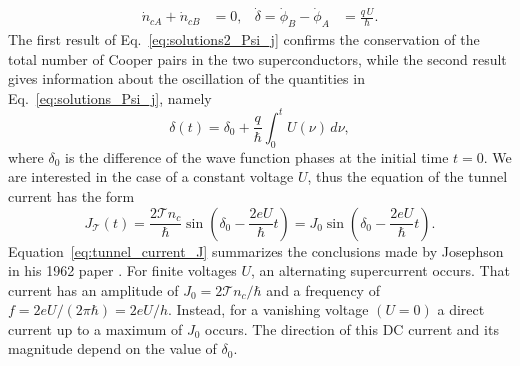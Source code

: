 \documentclass[../main/main.tex]{subfiles}
\begin{document}
\begin{align} \label{eq:solutions2_Psi_j}
    \dot{n}_{cA} + \dot{n}_{cB} &= 0, & 
    \dot{\delta} = \dot{\phi}_B - \dot{\phi}_A &= \frac{q\, U}{\hbar}.
\end{align}
The first result of Eq.~\eqref{eq:solutions2_Psi_j}
confirms the conservation of the total number of Cooper pairs in the two superconductors, while the second result gives information about the oscillation of the quantities in Eq.~\eqref{eq:solutions_Psi_j}, namely
\begin{equation} \label{eq:delta_time_integration}
    \delta(t) = \delta_0 + \frac{q}{\hbar} \int_{0}^{t} U(\nu) \,d\nu ,
\end{equation}
where $\delta_0$ is the difference of the wave function phases at the initial time $t=0$. We are interested in the case of a constant voltage $U$, thus the equation of the tunnel current has the form
\begin{equation} \label{eq:tunnel_current_J}
    J_{\mathcal{T}}(t) = \frac{2 \mathcal{T} n_c}{\hbar} \sin{\left(\delta_0 - \frac{2e U}{\hbar}t\right)} = J_0 \sin{\left(\delta_0 - \frac{2e U}{\hbar}t\right)}.
\end{equation}
Equation~\eqref{eq:tunnel_current_J} summarizes the conclusions made by Josephson in his 1962 paper \cite{JOSEPHSON1962251}. For finite voltages $U$, an alternating supercurrent occurs. That current has an amplitude of $J_0 = 2 \mathcal{T} n_c/\hbar$ and a frequency of $f=2 e U /(2\pi \hbar) = 2 e U/h$. Instead, for a vanishing voltage $(U=0)$ a direct current up to a maximum of $J_0$ occurs. The direction of this DC current and its magnitude depend on the value of $\delta_0$.
\end{document}
